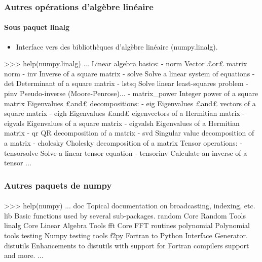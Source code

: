 \begin{frame}[fragile]
\frametitle{Autres opérations d'algèbre linéaire}
\framesubtitle{Sous paquet linalg}
\begin{itemize}
 \item Interface vers des bibliothèques d'algèbre linéaire (numpy.linalg). 
\end{itemize}
\begin{pythonConsole}
>>> help(numpy.linalg)
...
    Linear algebra basics:
    - norm            Vector £or£ matrix norm
    - inv             Inverse of a square matrix
    - solve           Solve a linear system of equations
    - det             Determinant of a square matrix
    - lstsq           Solve linear least-squares problem
    - pinv            Pseudo-inverse (Moore-Penrose)...
    - matrix_power    Integer power of a square matrix
    Eigenvalues £and£ decompositions:
    - eig             Eigenvalues £and£ vectors of a square matrix
    - eigh            Eigenvalues £and£ eigenvectors of a Hermitian matrix
    - eigvals         Eigenvalues of a square matrix
    - eigvalsh        Eigenvalues of a Hermitian matrix
    - qr              QR decomposition of a matrix
    - svd             Singular value decomposition of a matrix
    - cholesky        Cholesky decomposition of a matrix
    Tensor operations:
    - tensorsolve     Solve a linear tensor equation
    - tensorinv       Calculate an inverse of a tensor
...
\end{pythonConsole}
\end{frame}
\begin{frame}[fragile]
\frametitle{Autres paquets de numpy}
\framesubtitle{}
\begin{pythonConsole}
>>> help(numpy)
...
    doc
        Topical documentation on broadcasting, indexing, etc.
    lib
        Basic functions used by several sub-packages.
    random
        Core Random Tools
    linalg
        Core Linear Algebra Tools
    fft
        Core FFT routines
    polynomial
        Polynomial tools
    testing
        Numpy testing tools
    f2py
        Fortran to Python Interface Generator.
    distutils
        Enhancements to distutils with support for
        Fortran compilers support and more.
...
\end{pythonConsole}
\end{frame}
